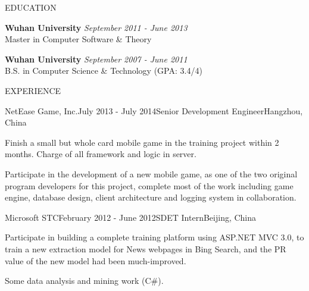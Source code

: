 \documentclass{resume} %
\begin{document}
\begin{rSection}{EDUCATION}

{\bf Wuhan University} \hfill {\em September 2011 - June 2013} \\
Master in Computer Software \& Theory
\vspace{0.3em}

{\bf Wuhan University} \hfill {\em September 2007 - June 2011} \\
B.S. in Computer Science \& Technology (GPA: 3.4/4)
\vspace{0.5em}

\end{rSection}

\begin{rSection}{EXPERIENCE}

\begin{rSubsection}{NetEase Game, Inc.}{July 2013 - July 2014}{Senior Development Engineer}{Hangzhou, China}
\item Finish a small but whole card mobile game in the training project within 2 months. Charge of all framework and logic in server.
\item Participate in the development of a new mobile game, as one of the two original program developers for this project, complete most of the work including game engine, database design, client architecture and logging system in collaboration.
    
\end{rSubsection}
\begin{rSubsection}{Microsoft STC}{February 2012 - June 2012}{SDET Intern}{Beijing, China}
\item Participate in building a complete training platform using ASP.NET MVC 3.0, to train a new extraction model for News webpages in Bing Search, and the PR value of the new model had been much-improved.
\item Some data analysis and mining work (C\#).
\end{rSubsection}

\end{rSection}
\end{document}
